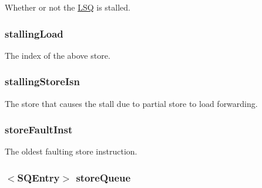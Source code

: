 \label{classOzoneLWLSQ_a6f8bff553ad30865c7d0c62e05421eb8}
Whether or not the \hyperlink{classLSQ}{LSQ} is stalled. \hypertarget{classOzoneLWLSQ_a567a64b358df6ae6162124cfe4d00db3}{
\subsubsection[{stallingLoad}]{ {\bf stallingLoad}}}
\label{classOzoneLWLSQ_a567a64b358df6ae6162124cfe4d00db3}
The index of the above store. \hypertarget{classOzoneLWLSQ_afe1cdcfca6b44c28581d862228adc3da}{
\subsubsection[{stallingStoreIsn}]{ {\bf stallingStoreIsn}}}
\label{classOzoneLWLSQ_afe1cdcfca6b44c28581d862228adc3da}
The store that causes the stall due to partial store to load forwarding. \hypertarget{classOzoneLWLSQ_ab98cf7d5235b7402e8916e78569f4ab2}{
\subsubsection[{storeFaultInst}]{ {\bf storeFaultInst}}}
\label{classOzoneLWLSQ_ab98cf7d5235b7402e8916e78569f4ab2}
The oldest faulting store instruction. \hypertarget{classOzoneLWLSQ_aadda2adf789b0c8a3eb952ac5d65d4ed}{
\subsubsection[{storeQueue}]{$<${\bf SQEntry}$>$ {\bf storeQueue}}}
